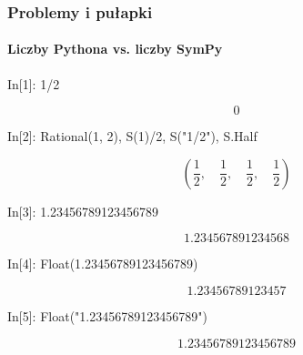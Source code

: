 \documentclass[10pt]{beamer}
\begin{document}
\begin{frame}[fragile]
  \frametitle{Problemy i pułapki}
  \framesubtitle{Liczby Pythona vs. liczby SymPy}

  \begin{python}
    In[1]: 1/2
  \end{python}
  \begin{equation*}
    0
  \end{equation*}

  \begin{python}
    In[2]: Rational(1, 2), S(1)/2, S("1/2"), S.Half
  \end{python}
  \begin{equation*}
    \left ( \frac{1}{2}, \quad \frac{1}{2}, \quad \frac{1}{2}, \quad \frac{1}{2}\right )
  \end{equation*}

  \pause

  \begin{python}
    In[3]: 1.23456789123456789
  \end{python}
  \begin{equation*}
    1.234567891234568
  \end{equation*}

  \begin{python}
    In[4]: Float(1.23456789123456789)
  \end{python}
  \begin{equation*}
    1.23456789123457
  \end{equation*}

  \begin{python}
    In[5]: Float("1.23456789123456789")
  \end{python}
  \begin{equation*}
    1.23456789123456789
  \end{equation*}
\end{frame}
\end{document}
